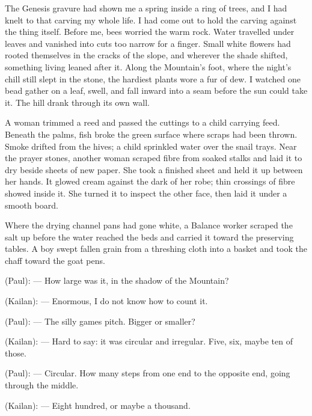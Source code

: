 The Genesis gravure had shown me a spring inside a ring of trees, and I had knelt to that carving my whole life. I had come out to hold the carving against the thing itself. Before me, bees worried the warm rock. Water travelled under leaves and vanished into cuts too narrow for a finger. Small white flowers had rooted themselves in the cracks of the slope, and wherever the shade shifted, something living leaned after it. Along the Mountain's foot, where the night's chill still slept in the stone, the hardiest plants wore a fur of dew. I watched one bead gather on a leaf, swell, and fall inward into a seam before the sun could take it. The hill drank through its own wall.

A woman trimmed a reed and passed the cuttings to a child carrying feed. Beneath the palms, fish broke the green surface where scraps had been thrown. Smoke drifted from the hives; a child sprinkled water over the snail trays. Near the prayer stones, another woman scraped fibre from soaked stalks and laid it to dry beside sheets of new paper. She took a finished sheet and held it up between her hands. It glowed cream against the dark of her robe; thin crossings of fibre showed inside it. She turned it to inspect the other face, then laid it under a smooth board.\par

Where the drying channel pans had gone white, a Balance worker scraped the salt up before the water reached the beds and carried it toward the preserving tables. A boy swept fallen grain from a threshing cloth into a basket and took the chaff toward the goat pens.\par

\begin{room}

(Paul): --- How large was it, in the shadow of the Mountain?

(Kailan): --- Enormous, I do not know how to count it.

(Paul): --- The silly games pitch. Bigger or smaller?

(Kailan): --- Hard to say: it was circular and irregular. Five, six, maybe ten of those.

(Paul): --- Circular. How many steps from one end to the opposite end, going through the middle.

(Kailan): --- Eight hundred, or maybe a thousand.

\end{room}

